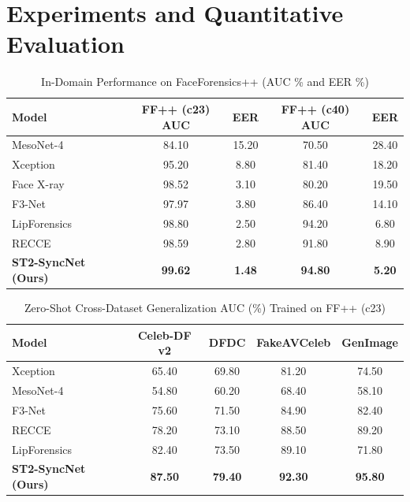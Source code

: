 \documentclass[journal]{IEEEtran}
\begin{document}
\section{Experiments and Quantitative Evaluation}

\begin{table}[t]
\centering
\caption{In-Domain Performance on FaceForensics++ (AUC \% and EER \%)}
\label{tab:ffpp}
\begin{tabular}{lcccc}
\toprule
Model & FF++ (c23) AUC & EER & FF++ (c40) AUC & EER \\
\midrule
MesoNet-4~\cite{afchar2018mesonet} & 84.10 & 15.20 & 70.50 & 28.40 \\
Xception~\cite{rossler2019faceforensics} & 95.20 & 8.80 & 81.40 & 18.20 \\
Face X-ray~\cite{li2020facexray} & 98.52 & 3.10 & 80.20 & 19.50 \\
F3-Net~\cite{qian2020f3net} & 97.97 & 3.80 & 86.40 & 14.10 \\
LipForensics~\cite{haliassos2021lips} & 98.80 & 2.50 & 94.20 & 6.80 \\
RECCE~\cite{cao2022recce} & 98.59 & 2.80 & 91.80 & 8.90 \\
\textbf{ST2-SyncNet (Ours)} & \textbf{99.62} & \textbf{1.48} & \textbf{94.80} & \textbf{5.20} \\
\bottomrule
\end{tabular}
\end{table}

\begin{table}[t]
\centering
\caption{Zero-Shot Cross-Dataset Generalization AUC (\%) Trained on FF++ (c23)}
\label{tab:cross_dataset}
\begin{tabular}{lcccc}
\toprule
Model & Celeb-DF v2 & DFDC & FakeAVCeleb & GenImage \\
\midrule
Xception~\cite{rossler2019faceforensics} & 65.40 & 69.80 & 81.20 & 74.50 \\
MesoNet-4~\cite{afchar2018mesonet} & 54.80 & 60.20 & 68.40 & 58.10 \\
F3-Net~\cite{qian2020f3net} & 75.60 & 71.50 & 84.90 & 82.40 \\
RECCE~\cite{cao2022recce} & 78.20 & 73.10 & 88.50 & 89.20 \\
LipForensics~\cite{haliassos2021lips} & 82.40 & 73.50 & 89.10 & 71.80 \\
\textbf{ST2-SyncNet (Ours)} & \textbf{87.50} & \textbf{79.40} & \textbf{92.30} & \textbf{95.80} \\
\bottomrule
\end{tabular}
\end{table}
\end{document}
